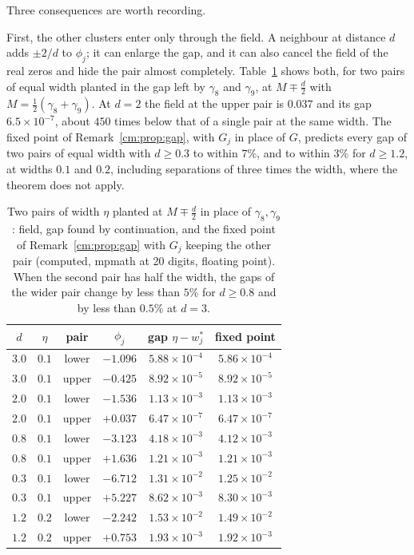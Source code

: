 Three consequences are worth recording.

First, the other clusters enter only through the field. A neighbour at distance $d$ adds $\pm2/d$ to $\phi_j$; it can enlarge the gap, and it can also cancel the field of the real zeros and hide the pair almost completely. Table~\ref{cm:tab:pairs} shows both, for two pairs of equal width planted in the gap left by $\gamma_8$ and $\gamma_9$, at $M\mp\frac d2$ with $M=\frac12(\gamma_8+\gamma_9)$. At $d=2$ the field at the upper pair is $0.037$ and its gap $6.5\times10^{-7}$, about $450$ times below that of a single pair at the same width. The fixed point of Remark~\ref{cm:prop:gap}, with $G_j$ in place of $G$, predicts every gap of two pairs of equal width with $d\ge0.3$ to within $7\%$, and to within $3\%$ for $d\ge1.2$, at widths $0.1$ and $0.2$, including separations of three times the width, where the theorem does not apply.

\begin{table}[htbp]
\centering
\begin{tabular}{cccccc}
$d$ & $\eta$ & pair & $\phi_j$ & gap $\eta-w_j^*$ & fixed point \\ \hline
$3.0$ & $0.1$ & lower & $-1.096$ & $5.88\times10^{-4}$ & $5.86\times10^{-4}$\\
$3.0$ & $0.1$ & upper & $-0.425$ & $8.92\times10^{-5}$ & $8.92\times10^{-5}$\\
$2.0$ & $0.1$ & lower & $-1.536$ & $1.13\times10^{-3}$ & $1.13\times10^{-3}$\\
$2.0$ & $0.1$ & upper & $+0.037$ & $6.47\times10^{-7}$ & $6.47\times10^{-7}$\\
$0.8$ & $0.1$ & lower & $-3.123$ & $4.18\times10^{-3}$ & $4.12\times10^{-3}$\\
$0.8$ & $0.1$ & upper & $+1.636$ & $1.21\times10^{-3}$ & $1.21\times10^{-3}$\\
$0.3$ & $0.1$ & lower & $-6.712$ & $1.31\times10^{-2}$ & $1.25\times10^{-2}$\\
$0.3$ & $0.1$ & upper & $+5.227$ & $8.62\times10^{-3}$ & $8.30\times10^{-3}$\\
$1.2$ & $0.2$ & lower & $-2.242$ & $1.53\times10^{-2}$ & $1.49\times10^{-2}$\\
$1.2$ & $0.2$ & upper & $+0.753$ & $1.93\times10^{-3}$ & $1.92\times10^{-3}$\\
\end{tabular}
\caption{Two pairs of width $\eta$ planted at $M\mp\frac d2$ in place of $\gamma_8,\gamma_9$: field, gap found by continuation, and the fixed point of Remark~\ref{cm:prop:gap} with $G_j$ keeping the other pair (computed, mpmath at 20 digits, floating point). When the second pair has half the width, the gaps of the wider pair change by less than $5\%$ for $d\ge0.8$ and by less than $0.5\%$ at $d=3$.}
\label{cm:tab:pairs}
\end{table}

